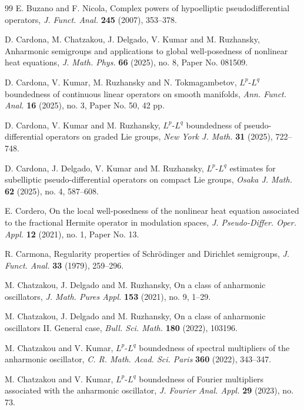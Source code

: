 \documentclass[12pt, reqno]{amsart}
\theoremstyle{definition}
\theoremstyle{remark}
\numberwithin{equation}{section}
\begin{document}
\begin{thebibliography}{99}
E. Buzano and F. Nicola,
Complex powers of hypoelliptic pseudodifferential operators,
\emph{J. Funct. Anal.} \textbf{245} (2007), 353--378.




D. Cardona, M. Chatzakou, J. Delgado, V. Kumar and M. Ruzhansky,
Anharmonic semigroups and applications to global well-posedness of nonlinear heat equations,
\emph{J. Math. Phys.} \textbf{66} (2025), no. 8, Paper No. 081509.



D. Cardona, V. Kumar, M. Ruzhansky and N. Tokmagambetov,
$L^p$-$L^q$ boundedness of continuous linear operators on smooth manifolds,
\emph{Ann. Funct. Anal.} \textbf{16} (2025), no. 3, Paper No. 50, 42 pp.

D. Cardona, V. Kumar and M. Ruzhansky,
$L^p$-$L^q$ boundedness of pseudo-differential operators on graded Lie groups,
\emph{New York J. Math.} \textbf{31} (2025), 722--748.

D. Cardona, J. Delgado, V. Kumar and M. Ruzhansky,
$L^p$-$L^q$ estimates for subelliptic pseudo-differential operators on compact Lie groups,
\emph{Osaka J. Math.} \textbf{62} (2025), no. 4, 587--608.

E. Cordero,
On the local well-posedness of the nonlinear heat equation associated to the fractional Hermite operator in modulation spaces,
\emph{J. Pseudo-Differ. Oper. Appl.} \textbf{12} (2021), no. 1, Paper No. 13.

R. Carmona,
Regularity properties of Schr\"odinger and Dirichlet semigroups,
\emph{J. Funct. Anal.} \textbf{33} (1979), 259--296.



M. Chatzakou, J. Delgado and M. Ruzhansky,
On a class of anharmonic oscillators,
\emph{J. Math. Pures Appl.} \textbf{153} (2021), no. 9, 1--29.

M. Chatzakou, J. Delgado and M. Ruzhansky,
On a class of anharmonic oscillators II. General case,
\emph{Bull. Sci. Math.} \textbf{180} (2022), 103196.

M. Chatzakou and V. Kumar,
$L^p$-$L^q$ boundedness of spectral multipliers of the anharmonic oscillator,
\emph{C. R. Math. Acad. Sci. Paris} \textbf{360} (2022), 343--347.

M. Chatzakou and V. Kumar,
$L^p$-$L^q$ boundedness of Fourier multipliers associated with the anharmonic oscillator,
\emph{J. Fourier Anal. Appl.} \textbf{29} (2023), no. 73.


\end{thebibliography}
\end{document}
